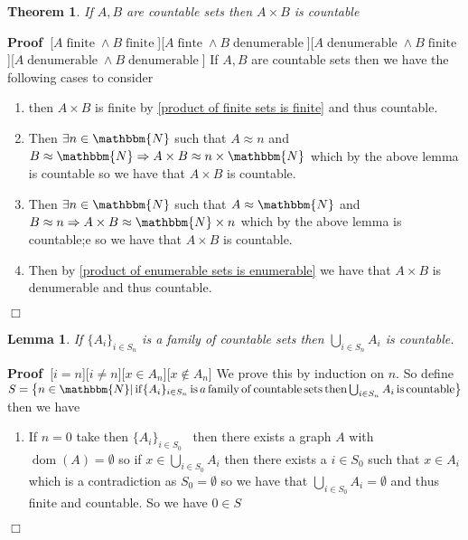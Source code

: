 \documentclass{book}
\newcommand{\nin}{\not\in}
\newcommand{\tmop}[1]{\ensuremath{\operatorname{#1}}}
\newenvironment{proof}{\noindent\textbf{Proof\ }}{\hspace*{\fill}$\Box$\medskip}
\newtheorem{lemma}{Lemma}
\newtheorem{theorem}{Theorem}
\begin{document}
{{\begin{theorem}
  If $A, B$ are countable sets then $A \times B$ is countable
\end{theorem}

\begin{proof}[$A \tmop{finite} \wedge B \tmop{finite}$][$A \tmop{finte} \wedge
B \tmop{denumerable}$][$A \tmop{denumerable} \wedge B \tmop{finite}$][$A
\tmop{denumerable} \wedge B \tmop{denumerable}$]
  If $A, B$ are countable sets then we have the following cases to consider
  \begin{enumerate}
    \item then $A \times B$ is finite by \ref{product of finite sets is
    finite} and thus countable.
    
    \item Then $\exists n \in \mathbbm{N}$ such that $A \approx n$ and $B
    \approx \mathbbm{N} \Rightarrow A \times B \approx n \times \mathbbm{N}$
    which by the above lemma is countable so we have that $A \times B$ is
    countable.
    
    \item Then $\exists n \in \mathbbm{N}$ such that $A \approx \mathbbm{N}$
    and $B \approx n \Rightarrow A \times B \approx \mathbbm{N} \times n$
    which by the above lemma is countable;e so we have that $A \times B$ is
    countable.
    
    \item Then by \ref{product of enumerable sets is enumerable} we have that
    $A \times B$ is denumerable and thus countable.
  \end{enumerate}
\end{proof}

\begin{lemma}
  If $\{ A_i \}_{i \in S_n}$ is a family of countable sets then $\bigcup_{i
  \in S_n} A_i$ is countable.
\end{lemma}

\begin{proof}[$i = n$][$i \neq n$][$x \in A_n$][$x \nin A_n$]
  We prove this by induction on $n$. So define $S = \left\{ n \in \mathbbm{N}|
  \tmop{if} \{ A_i \}_{i \in S_n} \tmop{is} a \tmop{family} \tmop{of}
  \tmop{countable} \tmop{sets} \tmop{then} \bigcup_{i \in S_n} A_i \tmop{is}
  \tmop{countable} \right\}$ then we have
  \begin{enumerate}
    \item If $n = 0$ take then $\{ A_i \}_{i \in S_0}$ \ then there exists a
    graph $A$ with $\tmop{dom} (A) = \emptyset$ so if $x \in \bigcup_{i \in
    S_0} A_i$ then there exists a $i \in S_0$ such that $x \in A_i$ which is a
    contradiction as $S_0 = \emptyset$ so we have that $\bigcup_{i \in S_0}
    A_i = \emptyset$ and thus finite and countable. So we have $0 \in S$
    

\end{enumerate}
\end{proof}}}
\end{document}

